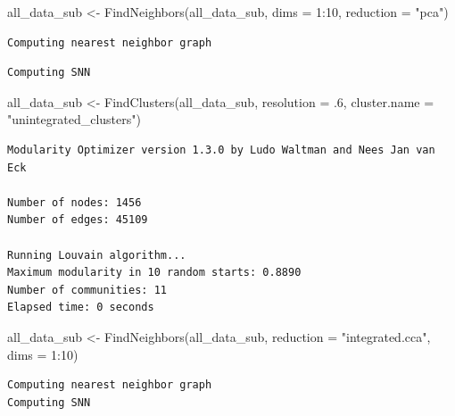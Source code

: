 \documentclass[
  letterpaper,
  DIV=11,
  numbers=noendperiod]{scrreprt}
\newenvironment{Shaded}{\begin{snugshade}}{\end{snugshade}}
\newcommand{\AttributeTok}[1]{\textcolor[rgb]{0.40,0.45,0.13}{#1}}
\newcommand{\DecValTok}[1]{\textcolor[rgb]{0.68,0.00,0.00}{#1}}
\newcommand{\FunctionTok}[1]{\textcolor[rgb]{0.28,0.35,0.67}{#1}}
\newcommand{\NormalTok}[1]{\textcolor[rgb]{0.00,0.23,0.31}{#1}}
\newcommand{\OtherTok}[1]{\textcolor[rgb]{0.00,0.23,0.31}{#1}}
\newcommand{\SpecialCharTok}[1]{\textcolor[rgb]{0.37,0.37,0.37}{#1}}
\newcommand{\StringTok}[1]{\textcolor[rgb]{0.13,0.47,0.30}{#1}}
\begin{document}
\begin{Shaded}
\begin{Highlighting}[]
\NormalTok{all\_data\_sub }\OtherTok{\textless{}{-}} \FunctionTok{FindNeighbors}\NormalTok{(all\_data\_sub, }\AttributeTok{dims =} \DecValTok{1}\SpecialCharTok{:}\DecValTok{10}\NormalTok{, }\AttributeTok{reduction =} \StringTok{"pca"}\NormalTok{)}
\end{Highlighting}
\end{Shaded}

\begin{verbatim}
Computing nearest neighbor graph
\end{verbatim}

\begin{verbatim}
Computing SNN
\end{verbatim}

\begin{Shaded}
\begin{Highlighting}[]
\NormalTok{all\_data\_sub }\OtherTok{\textless{}{-}} \FunctionTok{FindClusters}\NormalTok{(all\_data\_sub, }\AttributeTok{resolution =}\NormalTok{ .}\DecValTok{6}\NormalTok{, }\AttributeTok{cluster.name =} \StringTok{"unintegrated\_clusters"}\NormalTok{)}
\end{Highlighting}
\end{Shaded}

\begin{verbatim}
Modularity Optimizer version 1.3.0 by Ludo Waltman and Nees Jan van Eck

Number of nodes: 1456
Number of edges: 45109

Running Louvain algorithm...
Maximum modularity in 10 random starts: 0.8890
Number of communities: 11
Elapsed time: 0 seconds
\end{verbatim}

\begin{Shaded}
\begin{Highlighting}[]
\NormalTok{all\_data\_sub }\OtherTok{\textless{}{-}} \FunctionTok{FindNeighbors}\NormalTok{(all\_data\_sub, }\AttributeTok{reduction =} \StringTok{"integrated.cca"}\NormalTok{, }\AttributeTok{dims =} \DecValTok{1}\SpecialCharTok{:}\DecValTok{10}\NormalTok{)}
\end{Highlighting}
\end{Shaded}

\begin{verbatim}
Computing nearest neighbor graph
Computing SNN
\end{verbatim}
\end{document}
